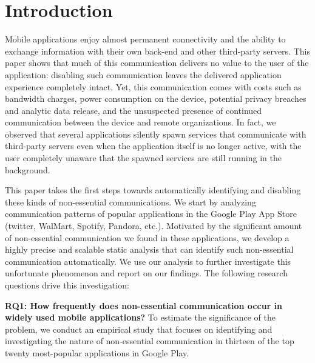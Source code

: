 \vspace{-0.05in}
\section{Introduction}
\label{sec:intro} 

Mobile applications enjoy almost permanent connectivity and the
ability to exchange information with their own back-end and other
third-party servers.  This paper shows that much of this communication
delivers no value to the user of the application: disabling such
communication leaves the delivered application experience completely
intact.  Yet, this communication comes with costs such as bandwidth
charges, power consumption on the device, potential privacy breaches
and analytic data release, and the unsuspected presence of continued
communication between the device and remote organizations. In fact, we
observed that several applications silently spawn services that
communicate with third-party servers even when the application itself
is no longer active, with the user completely unaware that the spawned
services are still running in the background. 


This paper takes the first steps towards automatically identifying and
disabling these kinds of non-essential communications. We start by
analyzing communication patterns of
popular applications in the Google Play App Store (twitter, WalMart,
Spotify, Pandora, etc.). Motivated by the significant
amount of non-essential communication we found in these applications, 
we develop a highly precise and scalable static analysis that can identify 
such non-essential communication automatically. We use our analysis to further 
investigate this unfortunate phenomenon and report on our findings. 
The following research questions drive this investigation:


\noindent 
{\bf RQ1: How frequently does non-essential communication occur in
  widely used mobile applications?}  To estimate the significance of
the problem, we conduct an empirical study that focuses on identifying
and investigating the nature of non-essential communication in thirteen of the 
top twenty most-popular applications in Google Play.

